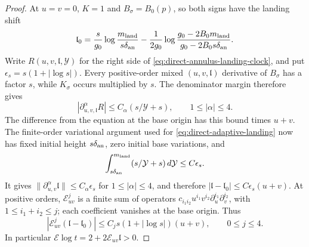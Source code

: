 \begin{proof}
At \(u=v=0\), \(K=1\) and \(B_\sigma=B_0(p)\), so both signs
have the landing shift
\[
 \mathfrak l_0=\frac{s}{g_0}\log\frac{m_{\rm land}}{s\delta_{\rm an}}
       -\frac{1}{2g_0}
          \log\frac{g_0-2B_0m_{\rm land}}{g_0-2B_0s\delta_{\rm an}}.
\]
Write \(R(u,v,\mathfrak l,\mathcal Y)\) for the right side of
\eqref{eq:direct-annulus-landing-clock}, and put
\(\epsilon_s=s(1+|\log s|)\). Every positive-order mixed
\((u,v,\mathfrak l)\) derivative of \(B_\sigma\) has a factor
\(s\), while \(K_\sigma\) occurs multiplied by \(s\).
The denominator margin therefore gives
\[
 |\partial_{u,v,\mathfrak l}^{\alpha}R|
       \le C_\alpha(s/\mathcal Y+s),\qquad 1\le|\alpha|\le4.
\]
The difference from the equation at the base origin has this bound
times \(u+v\). The finite-order variational argument used for
\eqref{eq:direct-adaptive-landing} now has fixed initial height
\(s\delta_{\rm an}\), zero initial base variations, and
\[
 \int_{s\delta_{\rm an}}^{m_{\rm land}}(s/\mathcal Y+s)\,d\mathcal Y
       \le C\epsilon_s.
\]
It gives \(\|\partial_{u,v}^{\alpha}\mathfrak l\|\le
C_\alpha\epsilon_s\) for \(1\le|\alpha|\le4\), and therefore
\(|\mathfrak l-\mathfrak l_0|\le C\epsilon_s(u+v)\).
At positive orders, \(\mathcal E_{uv}^j\) is a finite sum of
operators \(c_{i_1i_2}u^{i_1}v^{i_2}\partial_u^{i_1}\partial_v^{i_2}\), with
\(1\le i_1+i_2\le j\); each coefficient vanishes at the base
origin. Thus
\begin{equation}
\label{eq:direct-annulus-landing-weight}
 |\mathcal E_{uv}^j(\mathfrak l-\mathfrak l_0)|
       \le C_js(1+|\log s|)(u+v),\qquad 0\le j\le4.
\end{equation}
In particular \(\mathcal E\log t=2+2\mathcal E_{uv}\mathfrak l>0\).


\end{proof}
